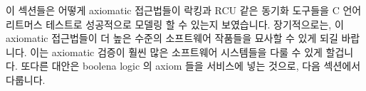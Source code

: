 이 섹션들은 어떻게 axiomatic 접근법들이 락킹과 RCU 같은 동기화 도구들을
C 언어 리트머스 테스트로 성공적으로 모델링 할 수 있는지 보였습니다.
장기적으로는, 이 axiomatic 접근법들이 더 높은 수준의 소프트웨어 작품들을 묘사할
수 있게 되길 바랍니다.
이는 axiomatic 검증이 훨씬 많은 소프트웨어 시스템들을 다룰 수 있게 할겁니다.
또다른 대안은 boolena logic 의 axiom 들을 서비스에 넣는 것으로, 다음 섹션에서
다룹니다.
\iffalse

These sections have shown how axiomatic approaches can successfully
model synchronization primitives such as locking and RCU in C-language
litmus tests.
Longer term, the hope is that the axiomatic approaches incorporate
axioms describing even higher-level software artifacts.
This could potentially allow axiomatic verification of much larger
software systems.
Another alternative is to press the axioms of boolean logic into service,
as described in the next section.
\fi
